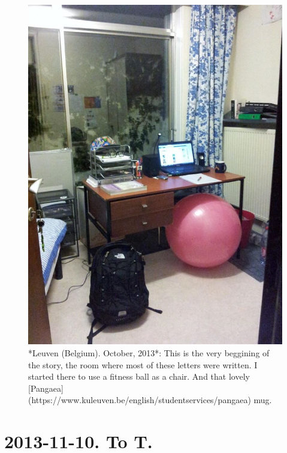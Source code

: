 \documentclass[]{book}
\begin{document}
\begin{figure}

{\centering \includegraphics[width=0.75\linewidth]{images/2014/room} 

}

\caption{*Leuven (Belgium). October, 2013*: This is the very beggining of the story, the room where most of these letters were written. I started there to use a fitness ball as a chair. And that lovely [Pangaea](https://www.kuleuven.be/english/studentservices/pangaea) mug.}\label{fig:room}
\end{figure}

\hypertarget{tot20131110}{%
\section*{2013-11-10. To T.}\label{tot20131110}}
\end{document}
